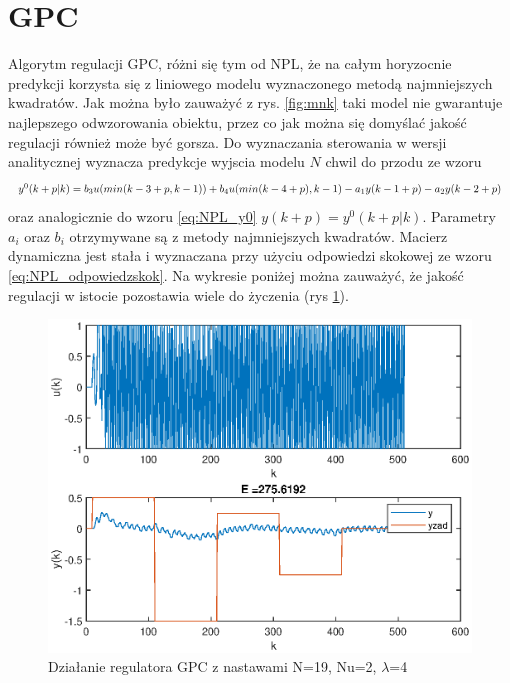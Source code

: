 	\newpage	
	\section{GPC}
		\label{sec:GPC}
		Algorytm regulacji GPC, różni się tym od NPL, że na całym horyzocnie predykcji korzysta się z liniowego modelu wyznaczonego metodą najmniejszych kwadratów. Jak można było zauważyć z rys. \ref{fig:mnk} taki model nie gwarantuje najlepszego odwzorowania obiektu, przez co jak można się domyślać jakość regulacji również może być gorsza.
		Do wyznaczania sterowania w wersji analitycznej wyznacza predykcje wyjscia modelu $N$ chwil do przodu ze wzoru
		\begin{equation}
		\begin{tabular}{l}
		$y^0(k+p|k)=b_3u(min(k-3+p,k-1))+b_4u(min(k-4+p),k-1)-a_1y(k-1+p)-a_2y(k-2+p)$
		\end{tabular}
		\label{eq:GPC_y0}
		\end{equation}
		oraz analogicznie do wzoru \ref{eq:NPL_y0} $y(k+p)=y^0(k+p|k)$. Parametry $a_i$ oraz $b_i$ otrzymywane są z metody najmniejszych kwadratów. Macierz dynamiczna jest stała i wyznaczana przy użyciu odpowiedzi skokowej ze wzoru \ref{eq:NPL_odpowiedzskok}. Na wykresie poniżej można zauważyć, że jakość regulacji w istocie pozostawia wiele do życzenia (rys \ref{fig:GPC}).
		
		\begin{figure}[h!]
			\centering
			\includegraphics[width=\linewidth]{img/strojenieGPC_N_19_Nu_2_lam_4.eps}
			\caption{Działanie regulatora GPC z nastawami N=19, Nu=2, $\lambda$=4}
			\label{fig:GPC}
		\end{figure}
	
